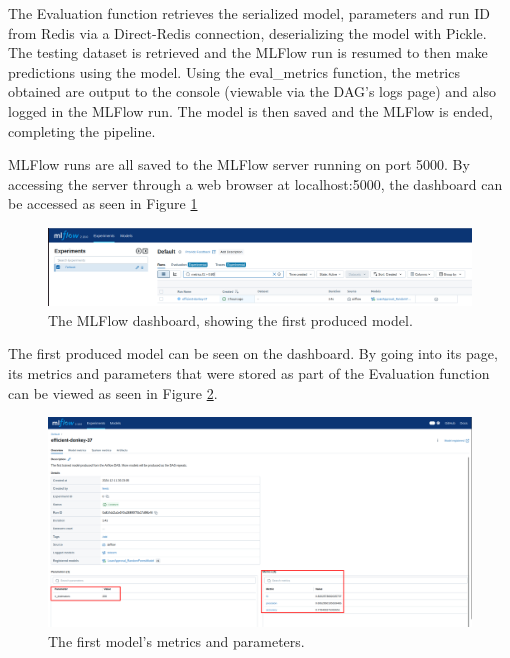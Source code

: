 \documentclass[12pt]{report}
\newcommand{\para}{\vspace{7pt}\noindent}
\begin{document}
\para The Evaluation function retrieves the serialized model, parameters and run ID from Redis 
via a Direct-Redis connection, deserializing the model with Pickle. The testing dataset is 
retrieved and the MLFlow run is resumed to then make predictions using the model. Using the 
eval\_metrics function, the metrics obtained are output to the console (viewable via the DAG's logs page)
and also logged in the MLFlow run. The model is then saved and the MLFlow is ended, completing the pipeline.

\para MLFlow runs are all saved to the MLFlow server running on port 5000. By accessing the server through 
a web browser at localhost:5000, the dashboard can be accessed as seen in Figure \ref{fig:MLFlowDash}

\begin{figure}[H]
    \centering
    \includegraphics[width=\linewidth]{Implementation/MLFlow/Other/1.png}
    \caption{The MLFlow dashboard, showing the first produced model.}
    \label{fig:MLFlowDash}
\end{figure}

\para The first produced model can be seen on the dashboard. By going into its page, its metrics and 
parameters that were stored as part of the Evaluation function can be viewed as seen in Figure \ref{fig:MLFlowModel}.

\begin{figure}[H]
    \centering
    \includegraphics[width=\linewidth]{Implementation/MLFlow/Other/2.png}
    \caption{The first model's metrics and parameters.}
    \label{fig:MLFlowModel}
\end{figure}
\end{document}

